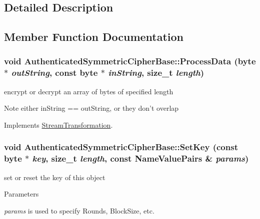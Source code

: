 \subsection{Detailed Description}


\subsection{Member Function Documentation}
\hypertarget{class_authenticated_symmetric_cipher_base_a2887c0e4c7e303bdb51dfd869b16189f}{
\subsubsection[{ProcessData}]{\setlength{\rightskip}{0pt plus 5cm}void AuthenticatedSymmetricCipherBase::ProcessData (byte $\ast$ {\em outString}, \/  const byte $\ast$ {\em inString}, \/  size\_\-t {\em length})}}
\label{class_authenticated_symmetric_cipher_base_a2887c0e4c7e303bdb51dfd869b16189f}


encrypt or decrypt an array of bytes of specified length \begin{DoxyNote}{Note}
either inString == outString, or they don't overlap 
\end{DoxyNote}


Implements \hyperlink{class_stream_transformation_a26feabde21bc4d1783195969733e3bb0}{StreamTransformation}.\hypertarget{class_authenticated_symmetric_cipher_base_aea1353c1d0a94c3f81ebcf53f6b7ea57}{
\subsubsection[{SetKey}]{\setlength{\rightskip}{0pt plus 5cm}void AuthenticatedSymmetricCipherBase::SetKey (const byte $\ast$ {\em key}, \/  size\_\-t {\em length}, \/  const {\bf NameValuePairs} \& {\em params})}}
\label{class_authenticated_symmetric_cipher_base_aea1353c1d0a94c3f81ebcf53f6b7ea57}


set or reset the key of this object 
\begin{DoxyParams}{Parameters}
\item[{\em params}]is used to specify Rounds, BlockSize, etc. \end{DoxyParams}


